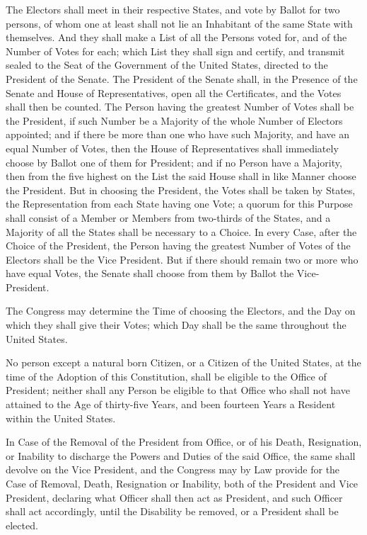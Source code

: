 \documentclass[12pt]{constitution}
\begin{document}
The Electors shall meet in their respective States, and vote by Ballot for two
persons, of whom one at least shall not lie an Inhabitant of the same State
with themselves. And they shall make a List of all the Persons voted for, and
of the Number of Votes for each; which List they shall sign and certify, and
transmit sealed to the Seat of the Government of the United States, directed to
the President of the Senate. The President of the Senate shall, in the Presence
of the Senate and House of Representatives, open all the Certificates, and the
Votes shall then be counted. The Person having the greatest Number of Votes
shall be the President, if such Number be a Majority of the whole Number of
Electors appointed; and if there be more than one who have such Majority, and
have an equal Number of Votes, then the House of Representatives shall
immediately choose by Ballot one of them for President; and if no Person have a
Majority, then from the five highest on the List the said House shall in like
Manner choose the President. But in choosing the President, the Votes shall be
taken by States, the Representation from each State having one Vote; a quorum
for this Purpose shall consist of a Member or Members from two-thirds of the
States, and a Majority of all the States shall be necessary to a Choice. In
every Case, after the Choice of the President, the Person having the greatest
Number of Votes of the Electors shall be the Vice President. But if there
should remain two or more who have equal Votes, the Senate shall choose from
them by Ballot the Vice-President.

The Congress may determine the Time of choosing the Electors, and the Day on
which they shall give their Votes; which Day shall be the same throughout the
United States.

No person except a natural born Citizen, or a Citizen of the United States, at
the time of the Adoption of this Constitution, shall be eligible to the Office
of President; neither shall any Person be eligible to that Office who shall not
have attained to the Age of thirty-five Years, and been fourteen Years a
Resident within the United States.

In Case of the Removal of the President from Office, or of his Death,
Resignation, or Inability to discharge the Powers and Duties of the said
Office, the same shall devolve on the Vice President, and the Congress may by
Law provide for the Case of Removal, Death, Resignation or Inability, both of
the President and Vice President, declaring what Officer shall then act as
President, and such Officer shall act accordingly, until the Disability be
removed, or a President shall be elected.
\end{document}
